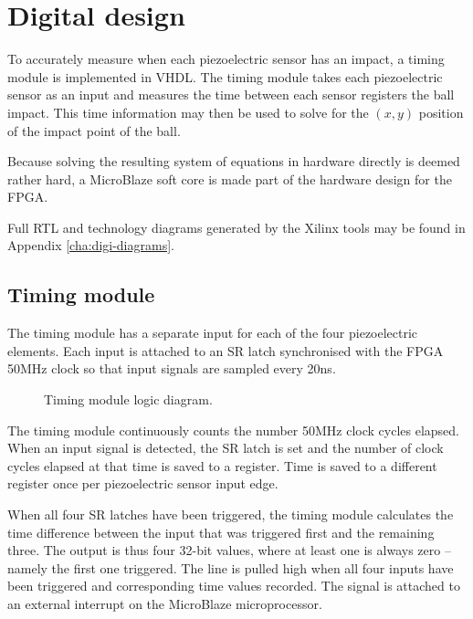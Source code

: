 \section{Digital design}
\label{cha:digidesign}

To accurately measure when each piezoelectric sensor has an impact, %
a timing module is implemented in VHDL.
The timing module takes each piezoelectric sensor as an input and measures the time between each sensor registers the ball impact.
This time information may then be used to solve for the $(x,y)$ position of the impact point of the ball.

Because solving the resulting system of equations in hardware directly is deemed rather hard, %
 a MicroBlaze soft core is made part of the hardware design for the FPGA.

 Full RTL and technology diagrams generated by the Xilinx tools may be found in Appendix \ref{cha:digi-diagrams}.

\subsection{Timing module}
\label{sec:timing_module}
The timing module has a separate input for each of the four piezoelectric elements.
Each input is attached to an SR latch synchronised with the FPGA 50\si{MHz} clock so that input signals are sampled every 20\si{ns}.

\begin{figure}[htb]
    \centering
    
    \caption{Timing module logic diagram.}
    \label{fig:timing}
\end{figure}

The timing module continuously counts the number 50\si{MHz} clock cycles elapsed.
When an input signal is detected, the SR latch is set and the number of clock cycles elapsed at that time is saved to a register.
Time is saved to a different register once per piezoelectric sensor input edge.

When all four SR latches have been triggered, the timing module calculates the time difference between the input that was triggered first and the remaining three.
The output is thus four 32-bit values, where at least one is always zero -- namely the first one triggered.
The line  is pulled high when all four inputs have been triggered and corresponding time values recorded.
The  signal is attached to an external interrupt on the MicroBlaze microprocessor.

